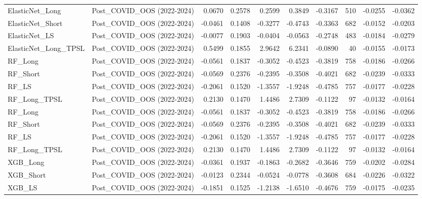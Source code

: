 \begin{tabular}{llrrrrrrrr}
\cline{1-10}
ElasticNet\_Long & Post\_COVID\_OOS (2022-2024) & 0.0670 & 0.2578 & 0.2599 & 0.3849 & -0.3167 & 510 & -0.0255 & -0.0362 \\
\cline{1-10}
ElasticNet\_Short & Post\_COVID\_OOS (2022-2024) & -0.0461 & 0.1408 & -0.3277 & -0.4743 & -0.3363 & 682 & -0.0152 & -0.0203 \\
\cline{1-10}
ElasticNet\_LS & Post\_COVID\_OOS (2022-2024) & -0.0077 & 0.1903 & -0.0404 & -0.0563 & -0.2748 & 483 & -0.0184 & -0.0279 \\
\cline{1-10}
ElasticNet\_Long\_TPSL & Post\_COVID\_OOS (2022-2024) & 0.5499 & 0.1855 & 2.9642 & 6.2341 & -0.0890 & 40 & -0.0155 & -0.0173 \\
\cline{1-10}
RF\_Long & Post\_COVID\_OOS (2022-2024) & -0.0561 & 0.1837 & -0.3052 & -0.4523 & -0.3819 & 758 & -0.0186 & -0.0266 \\
\cline{1-10}
RF\_Short & Post\_COVID\_OOS (2022-2024) & -0.0569 & 0.2376 & -0.2395 & -0.3508 & -0.4021 & 682 & -0.0239 & -0.0333 \\
\cline{1-10}
RF\_LS & Post\_COVID\_OOS (2022-2024) & -0.2061 & 0.1520 & -1.3557 & -1.9248 & -0.4785 & 757 & -0.0177 & -0.0228 \\
\cline{1-10}
RF\_Long\_TPSL & Post\_COVID\_OOS (2022-2024) & 0.2130 & 0.1470 & 1.4486 & 2.7309 & -0.1122 & 97 & -0.0132 & -0.0164 \\
\cline{1-10}
RF\_Long & Post\_COVID\_OOS (2022-2024) & -0.0561 & 0.1837 & -0.3052 & -0.4523 & -0.3819 & 758 & -0.0186 & -0.0266 \\
\cline{1-10}
RF\_Short & Post\_COVID\_OOS (2022-2024) & -0.0569 & 0.2376 & -0.2395 & -0.3508 & -0.4021 & 682 & -0.0239 & -0.0333 \\
\cline{1-10}
RF\_LS & Post\_COVID\_OOS (2022-2024) & -0.2061 & 0.1520 & -1.3557 & -1.9248 & -0.4785 & 757 & -0.0177 & -0.0228 \\
\cline{1-10}
RF\_Long\_TPSL & Post\_COVID\_OOS (2022-2024) & 0.2130 & 0.1470 & 1.4486 & 2.7309 & -0.1122 & 97 & -0.0132 & -0.0164 \\
\cline{1-10}
XGB\_Long & Post\_COVID\_OOS (2022-2024) & -0.0361 & 0.1937 & -0.1863 & -0.2682 & -0.3646 & 759 & -0.0202 & -0.0284 \\
\cline{1-10}
XGB\_Short & Post\_COVID\_OOS (2022-2024) & -0.0123 & 0.2344 & -0.0524 & -0.0778 & -0.3608 & 684 & -0.0226 & -0.0322 \\
\cline{1-10}
XGB\_LS & Post\_COVID\_OOS (2022-2024) & -0.1851 & 0.1525 & -1.2138 & -1.6510 & -0.4676 & 759 & -0.0175 & -0.0235 \\
\cline{1-10}

\end{tabular}
